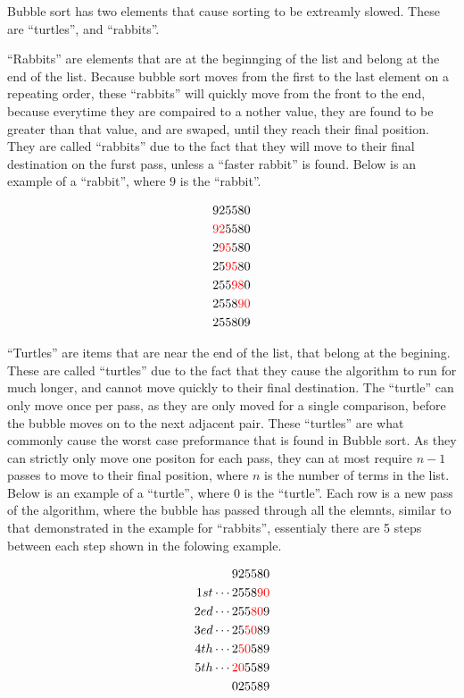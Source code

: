 \documentclass{subfile}
\begin{document}
\begin{multicols}{2}
     Bubble sort has two elements that cause sorting to be extreamly slowed.
     These are ``turtles'', and ``rabbits''.
 
     ``Rabbits'' are elements that are at the beginnging of the list and belong
     at the end of the list. Because bubble sort moves from the first to the
     last element on a repeating order, these ``rabbits'' will quickly move
     from the front to the end, because everytime they are compaired to a
     nother value, they are found to be greater than that value, and are
     swaped, until they reach their final position. They are called
     ``rabbits'' due to the fact that they will move to their final destination
     on the furst pass, unless a ``faster rabbit'' is found. Below is an
     example of a ``rabbit'', where $9$ is the ``rabbit''.

     \begin{align*}
       925580\\
       \textcolor{red}{92}5580\\
       2\textcolor{red}{95}580\\
       25\textcolor{red}{95}80\\
       255\textcolor{red}{98}0\\
       2558\textcolor{red}{90}\\
       255809\\
     \end{align*}
     
     ``Turtles'' are items that are near the end of the list, that belong at
     the begining. These are called ``turtles'' due to the fact that they cause
     the algorithm to run for much longer, and cannot move quickly to their
     final destination. The ``turtle'' can only move once per pass, as they are
     only moved for a single comparison, before the bubble moves on to the next
     adjacent pair. These ``turtles'' are what commonly cause the worst case
     preformance that is found in Bubble sort. As they can strictly only move
     one positon for each pass, they can at most require $n-1$ passes to move
     to their final position, where $n$ is the number of terms in the list.
     Below is an example of a ``turtle'', where $0$ is the ``turtle''. Each row
     is a new pass of the algorithm, where the bubble has passed through all
     the elemnts, similar to that demonstrated in the example for ``rabbits'',
     essentialy there are 5 steps between each step shown in the folowing
     example. 

     \begin{align*}
       925580\\
       1st \cdots 2558\textcolor{red}{90}\\
       2ed \cdots 255\textcolor{red}{80}9\\
       3ed \cdots 25\textcolor{red}{50}89\\
       4th \cdots 2\textcolor{red}{50}589\\
       5th \cdots \textcolor{red}{20}5589\\
       025589\\
     \end{align*}


\end{multicols}
\end{document}

